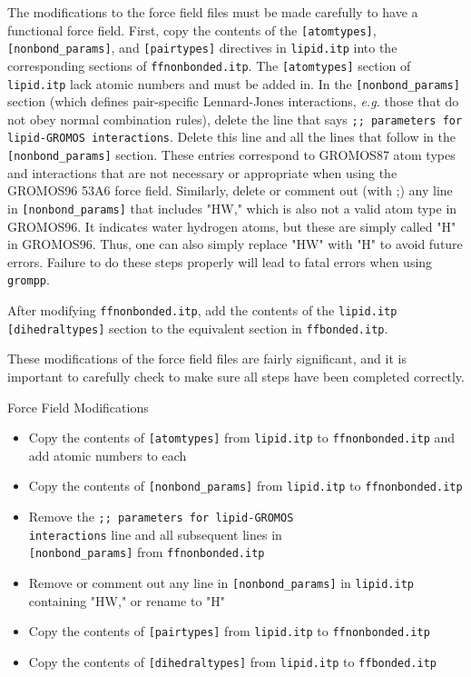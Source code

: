 \documentclass[9pt,tutorial,pubversion]{livecoms}
\begin{document}
The modifications to the force field files must be made carefully to have a functional force field. First, copy the contents of the \texttt{[atomtypes]}, \texttt{[nonbond\_params]}, and \texttt{[pairtypes]} directives in \texttt{lipid.itp} into the corresponding sections of \texttt{ffnonbonded.itp}. The \texttt{[atomtypes]} section of \texttt{lipid.itp} lack atomic numbers and must be added in. In the \texttt{[nonbond\_params]} section (which defines pair-specific Lennard-Jones interactions, {\em e.g.} those that do not obey normal combination rules), delete the line that says \texttt{;; parameters for lipid-GROMOS interactions}. Delete this line and all the lines that follow in the \texttt{[nonbond\_params]} section. These entries correspond to GROMOS87 atom types and interactions that are not necessary or appropriate when using the GROMOS96 53A6 force field. Similarly, delete or comment out (with ;) any line in \texttt{[nonbond\_params]} that includes "HW," which is also not a valid atom type in GROMOS96. It indicates water hydrogen atoms, but these are simply called "H" in GROMOS96. Thus, one can also simply replace "HW" with "H" to avoid future errors. Failure to do these steps properly will lead to fatal errors when using \texttt{grompp}.

After modifying \texttt{ffnonbonded.itp}, add the contents of the \texttt{lipid.itp} \texttt{[dihedraltypes]} section to the equivalent section in \texttt{ffbonded.itp}.

These modifications of the force field files are fairly significant, and it is important to carefully check to make sure all steps have been completed correctly.

\begin{Checklists}
\begin{checklist}{Force Field Modifications}
\begin{itemize}
	\item{Copy the contents of \texttt{[atomtypes]} from \texttt{lipid.itp} to \texttt{ffnonbonded.itp} and add atomic numbers to each}
	\item{Copy the contents of \texttt{[nonbond\_params]} from \texttt{lipid.itp} to \texttt{ffnonbonded.itp}}
	\item{Remove the \texttt{;; parameters for lipid-GROMOS \\interactions} line and all subsequent lines in \\\texttt{[nonbond\_params]} from \texttt{ffnonbonded.itp}}
	\item{Remove or comment out any line in \texttt{[nonbond\_params]} in \texttt{lipid.itp} containing "HW," or rename to "H"}
	\item{Copy the contents of \texttt{[pairtypes]} from \texttt{lipid.itp} to \texttt{ffnonbonded.itp}}
	\item{Copy the contents of \texttt{[dihedraltypes]} from \texttt{lipid.itp} to \texttt{ffbonded.itp}}
\end{itemize}
\end{checklist}
\end{Checklists}
\end{document}
